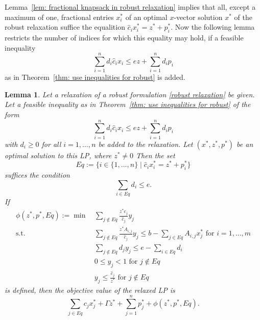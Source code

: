 \documentclass[titlepage, a4paper]{amsbook}
\theoremstyle{plain}
\newtheorem{lem}[thm]{Lemma}
\theoremstyle{break}
\theoremstyle{definition}
\theoremstyle{remark}
\numberwithin{equation}{thm}
\begin{document}
Lemma~\ref{lem: fractional knapsack in robust relaxation} implies that all, except a maximum of one, fractional entries $x^*_i$ of an optimal $x$-vector solution $x^*$ of the robust relaxation suffice the equalition $\hat{c}_ix^*_i = z^* + p^*_i$. Now the following lemma restricts the number of indices for which this equality may hold, if a feasible inequality 
\[\sum_{i=1}^n d_i \hat{c}_i x_i \leq e z + \sum_{i=1}^n d_i p_i\]
as in Theorem~\ref{thm: use inequalities for robust} is added.
\begin{lem}\label{lem:restriction on Eq}
Let a relaxation of a robust formulation \eqref{robust relaxation} be given. Let a feasible inequality as in Theorem~\ref{thm: use inequalities for robust} of the form
\[\sum_{i=1}^n d_i \hat{c}_i x_i \leq e z + \sum_{i=1}^n d_i p_i\]
with $d_i \geq 0$ for all $i=1, \ldots, n$ be added to the relaxation. Let $(x^*,z^*,p^*)$ be an optimal solution to this LP, where $z^* \neq 0$
Then the set \[Eq:=\{i \in \{1, \ldots, n\} \mid \hat{c}_ix^*_i=z^*+p^*_i\}\]
suffices the condition
\[\sum_{i \in Eq}d_i \leq e.\]
If 
\begin{equation}\label{eq: phi function}
\begin{split}
  \phi(z^*, p^*, Eq):=\min\, &\sum_{j \notin Eq}\frac{z^*c_j}{\hat{c}_j}y_j \\
  \text{s.t. }&\sum_{j \notin Eq}\frac{z^*A_{i,j}}{\hat{c}_j}y_j \leq b-\sum_{j \in Eq}A_{i,j}x^*_j\text{ for }i=1, \ldots, m \\
  &\sum_{j \notin Eq}d_jy_j \leq e - \sum_{i \in Eq}d_i \\
  &0 \leq y_j < 1 \text{ for }j \notin Eq \\
  &y_j \leq \frac{\hat{c}_j}{z^*} \text{ for }j \notin Eq
\end{split}
\end{equation}
is defined, then the objective value of the relaxed LP is
\[\sum_{j \in Eq}c_j x^*_j + \Gamma z^* + \sum_{j=1}^n p^*_j + \phi(z^*, p^*, Eq).\]
\end{lem}
\end{document}
